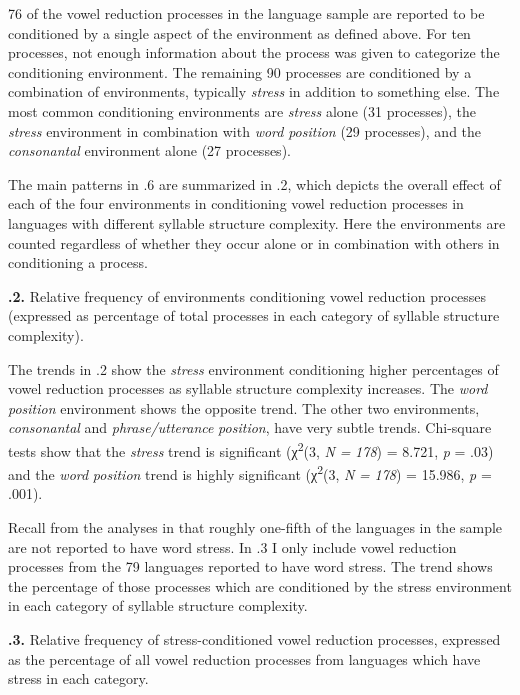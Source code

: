   76 of the vowel reduction processes in the language sample are reported to be conditioned by a single aspect of the environment as defined above. For ten processes, not enough information about the process was given to categorize the conditioning environment. The remaining 90 processes are conditioned by a combination of environments, typically \textit{stress} in addition to something else. The most common conditioning environments are \textit{stress} alone (31 processes), the \textit{stress} environment in combination with \textit{word} \textit{position} (29 processes), and the \textit{consonantal} environment alone (27 processes).

  The main patterns in .6 are summarized in .2, which depicts the overall effect of each of the four environments in conditioning vowel reduction processes in languages with different syllable structure complexity. Here the environments are counted regardless of whether they occur alone or in combination with others in conditioning a process.

\textbf{.2.} Relative frequency of environments conditioning vowel reduction processes (expressed as percentage of total processes in each category of syllable structure complexity).

  The trends in .2 show the \textit{stress} environment conditioning higher percentages of vowel reduction processes as syllable structure complexity increases. The \textit{word} \textit{position} environment shows the opposite trend. The other two environments, \textit{consonantal} and \textit{phrase/utterance} \textit{position}, have very subtle trends. Chi-square tests show that the \textit{stress} trend is significant (χ\textsuperscript{2}(3, \textit{N} \textit{=} \textit{178}) = 8.721, \textit{p} = .03) and the \textit{word} \textit{position} trend is highly significant (χ\textsuperscript{2}(3, \textit{N} \textit{=} \textit{178}) = 15.986, \textit{p} = .001).

  Recall from the analyses in  that roughly one-fifth of the languages in the sample are not reported to have word stress. In .3 I only include vowel reduction processes from the 79 languages reported to have word stress. The trend shows the percentage of those processes which are conditioned by the stress environment in each category of syllable structure complexity.

\textbf{.3.} Relative frequency of stress-conditioned vowel reduction processes, expressed as the percentage of all vowel reduction processes from languages which have stress in each category.

